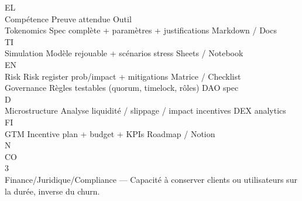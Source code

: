 \vspace{0.5em}
\vspace{0.5em}
\vspace{0.5em}
\vspace{0.5em}
EL\\
Compétence Preuve attendue                                      Outil\\
Tokenomics     Spec complète + paramètres + justifications      Markdown / Docs\\
\vspace{0.5em}
\vspace{0.5em}
\vspace{0.5em}
\vspace{0.5em}
TI\\
Simulation     Modèle rejouable + scénarios stress              Sheets / Notebook\\
\vspace{0.5em}
\vspace{0.5em}
\vspace{0.5em}
\vspace{0.5em}
EN\\
Risk           Risk register prob/impact + mitigations          Matrice / Checklist\\
Governance     Règles testables (quorum, timelock, rôles)       DAO spec\\
\vspace{0.5em}
\vspace{0.5em}
\vspace{0.5em}
\vspace{0.5em}
D\\
Microstructure Analyse liquidité / slippage / impact incentives DEX analytics\\
\vspace{0.5em}
\vspace{0.5em}
\vspace{0.5em}
\vspace{0.5em}
FI\\
GTM            Incentive plan + budget + KPIs                   Roadmap / Notion\\
\vspace{0.5em}
\vspace{0.5em}
N\\
CO\\
3\\
Finance/Juridique/Compliance — Capacité à conserver clients ou utilisateurs sur la durée, inverse du churn.\\
\vspace{0.5em}
